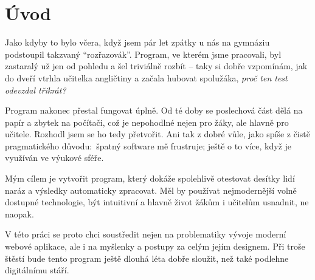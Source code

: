 \chapter*{Úvod}

Jako kdyby to bylo včera, když jsem pár let zpátky u nás na gymnáziu podstoupil takzvaný \enquote{rozřazovák}. Program, ve kterém jsme pracovali, byl zastaralý už jen od pohledu a šel triviálně rozbít -- taky si dobře vzpomínám, jak do dveří vtrhla učitelka angličtiny a začala hubovat spolužáka, \textit{proč ten test odevzdal třikrát?}

Program nakonec přestal fungovat úplně. Od té doby se poslechová část dělá na papír a zbytek na počítači, což je nepohodlné nejen pro žáky, ale hlavně pro učitele. Rozhodl jsem se ho tedy přetvořit. Ani tak z dobré vůle, jako spíše z čistě pragmatického důvodu:~špatný software mě frustruje; ještě o to více, když je využíván ve výukové sféře.

Mým cílem je vytvořit program, který dokáže spolehlivě otestovat desítky lidí naráz a výsledky automaticky zpracovat. Měl by používat nejmodernější volně dostupné technologie, být intuitivní a hlavně život žákům i učitelům usnadnit, ne naopak.

V této práci se proto chci soustředit nejen na problematiky vývoje moderní webové aplikace, ale i na myšlenky a postupy za celým jejím designem. Při troše štěstí bude tento program ještě dlouhá léta dobře sloužit, než také podlehne digitálnímu stáří.
